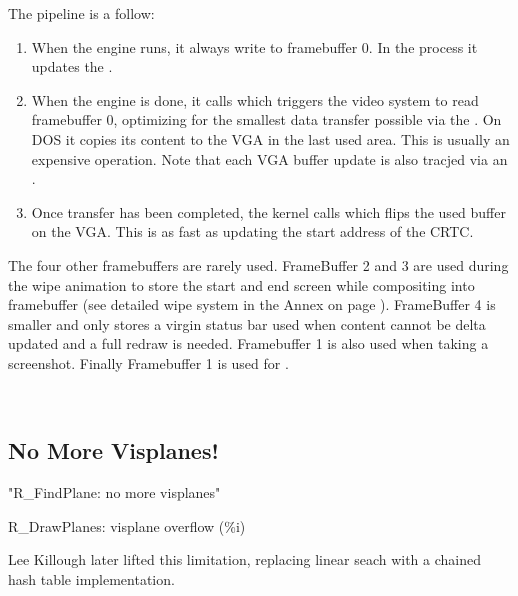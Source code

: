 \par
The pipeline is a follow:
\begin{enumerate}
\item When the engine runs, it always write to framebuffer 0. In the process it updates the .
\item When the engine is done, it calls  which triggers the video system to read framebuffer 0, optimizing for the smallest data transfer possible via the . On DOS it copies its content to the VGA in the last used area. This is usually an expensive operation. Note that each VGA buffer update is also tracjed via an .
\item Once transfer has been completed, the kernel calls   which flips the used buffer on the VGA. This is as fast as updating the start address of the CRTC.
\end{enumerate}
\par
The four other framebuffers are rarely used. FrameBuffer 2 and 3 are used during the wipe animation to store the start and end screen while compositing into framebuffer (see detailed wipe system in the Annex on page \pageref{label_melt}). FrameBuffer 4 is smaller and only stores a virgin status bar used when content cannot be delta updated and a full redraw is needed. Framebuffer 1 is also used when taking a screenshot. Finally Framebuffer 1 is used for .\\
\par
{}\\
\par
{}
\par
\subsection{No More Visplanes!}
"R\_FindPlane: no more visplanes"\\
\par
R\_DrawPlanes: visplane overflow (\%i)\\
\par

Lee Killough later lifted this limitation, replacing linear seach with a chained hash table implementation.